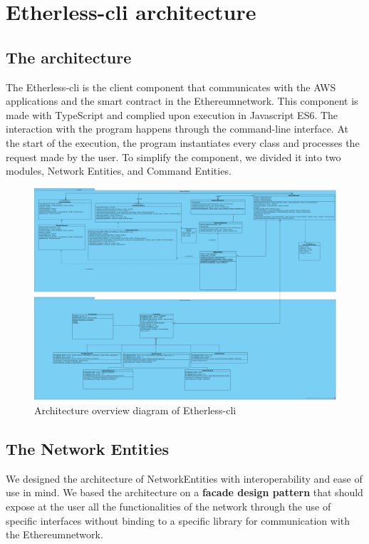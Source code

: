 \section{Etherless-cli architecture}
\subsection{The architecture}
The Etherless-cli is the client component that communicates with the AWS applications and the smart contract in the Ethereum\glo network.
This component is made with TypeScript and complied upon execution in Javascript ES6.
The interaction with the program happens through the command-line interface.
At the start of the execution, the program instantiates every class and processes the request made by the user.
To simplify the component, we divided it into two modules, Network Entities, and Command Entities.

\begin{figure}[h]
	\centering
	\includegraphics[width=\textwidth]{./res/img/Etherless-cli.png}
	\caption{Architecture overview diagram of Etherless-cli}
\end{figure}

\subsection{The Network Entities}
We designed the architecture of NetworkEntities with interoperability and ease of use in mind.
We based the architecture on a \textbf{facade design pattern} that should expose at the user all the functionalities
of the network through the use of specific interfaces without binding to a specific library for communication
with the Ethereum\glo network.
